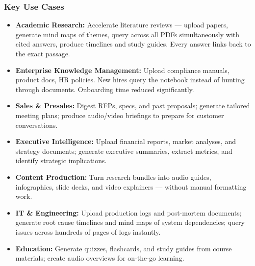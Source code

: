 \begin{frame}[fragile]\frametitle{Key Use Cases}
  \begin{itemize}
    \item \textbf{Academic Research:} Accelerate literature reviews — upload papers, generate mind maps of themes, query across all PDFs simultaneously with cited answers, produce timelines and study guides. Every answer links back to the exact passage.
    \item \textbf{Enterprise Knowledge Management:} Upload compliance manuals, product docs, HR policies. New hires query the notebook instead of hunting through documents. Onboarding time reduced significantly.
    \item \textbf{Sales \& Presales:} Digest RFPs, specs, and past proposals; generate tailored meeting plans; produce audio/video briefings to prepare for customer conversations.
    \item \textbf{Executive Intelligence:} Upload financial reports, market analyses, and strategy documents; generate executive summaries, extract metrics, and identify strategic implications.
    \item \textbf{Content Production:} Turn research bundles into audio guides, infographics, slide decks, and video explainers — without manual formatting work.
    \item \textbf{IT \& Engineering:} Upload production logs and post-mortem documents; generate root cause timelines and mind maps of system dependencies; query issues across hundreds of pages of logs instantly.
    \item \textbf{Education:} Generate quizzes, flashcards, and study guides from course materials; create audio overviews for on-the-go learning.
  \end{itemize}
\end{frame}

